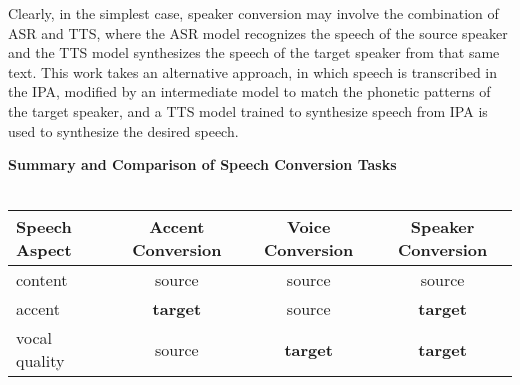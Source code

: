 Clearly, in the simplest case, speaker conversion may involve the combination of ASR and TTS, where the ASR model 
recognizes the speech of the source speaker and the TTS model synthesizes the speech of the target speaker from that same text.
This work takes an alternative approach, in which speech is transcribed in the IPA, 
modified by an intermediate model to match the phonetic patterns of the target speaker, and a TTS model trained 
to synthesize speech from IPA is used to synthesize the desired speech.

\begin{center}
  \textbf{Summary and Comparison of Speech Conversion Tasks}\\~\\
  \begin{tabular}{l|c|c|c}
      Speech Aspect   & Accent Conversion & Voice Conversion & Speaker Conversion \\\hline
      content         & source & source & source \\
      accent          & \textbf{target} & source & \textbf{target} \\
      vocal quality   & source & \textbf{target} & \textbf{target} \\
    \end{tabular}
  \end{center}
